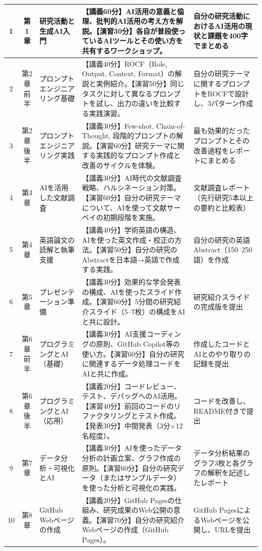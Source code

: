\begin{longtable}{ccp{1.8cm}p{3.3cm}p{1.8cm}}
1 & 第1章 & 研究活動と生成AI入門 & 【講義60分】AI活用の意義と倫理、批判的AI活用の考え方を解説。【演習30分】各自が普段使っているAIツールとその使い方を共有するワークショップ。 & 自分の研究活動におけるAI活用の現状と課題を400字でまとめる \\
\hline
2 & 第2章前半 & プロンプトエンジニアリング基礎 & 【講義40分】ROCF（Role, Output, Context, Format）の解説と実例紹介。【演習50分】同じタスクに対して異なるプロンプトを試し、出力の違いを比較する実践演習。 & 自分の研究テーマに関するプロンプトをROCFで設計し、3パターン作成 \\
\hline
3 & 第2章後半 & プロンプトエンジニアリング実践 & 【講義30分】Few-shot, Chain-of-Thought, 段階的プロンプトの解説。【演習60分】研究テーマに関する実践的なプロンプト作成と改善のサイクルを体験。 & 最も効果的だったプロンプトとその改善過程をレポートにまとめる \\
\hline
4 & 第3章 & AIを活用した文献調査 & 【講義30分】AI時代の文献調査戦略、ハルシネーション対策。【演習60分】自分の研究テーマについて、AIを使って文献サーベイの初期段階を実施。 & 文献調査レポート（先行研究5本以上の要約と比較表） \\
\hline
5 & 第4章 & 英語論文の読解と執筆支援 & 【講義40分】学術英語の構造、AIを使った英文作成・校正の方法。【演習50分】自分の研究のAbstractを日本語→英語で作成する実践。 & 自分の研究の英語Abstract（150--250語）を作成 \\
\hline
6 & 第5章 & プレゼンテーション準備 & 【講義30分】効果的な学会発表の構成、AIを使ったスライド作成。【演習60分】5分間の研究紹介スライド（5--7枚）の構成をAIと共に設計。 & 研究紹介スライドの完成版を提出 \\
\hline
7 & 第6章前半 & プログラミングとAI（基礎） & 【講義30分】AI支援コーディングの原則、GitHub Copilot等の使い方。【演習60分】自分の研究に関連するデータ処理コードをAIと共に作成。 & 作成したコードとAIとのやり取りの記録を提出 \\
\hline
8 & 第6章後半 & プログラミングとAI（応用） & 【講義20分】コードレビュー、テスト、デバッグへのAI活用。【演習40分】前回のコードのリファクタリングとテスト作成。【発表30分】中間発表（3分×12名程度）。 & コードを改善し、README付きで提出 \\
\hline
9 & 第7章 & データ分析・可視化とAI & 【講義30分】AIを使ったデータ分析の計画立案、グラフ作成の原則。【演習60分】自分の研究データ（またはサンプルデータ）を使った分析と可視化の実践。 & データ分析結果のグラフ3枚と各グラフの解釈を記述したレポート \\
\hline
10 & 第8章 & GitHub Webページの作成 & 【講義20分】GitHub Pagesの仕組み、研究成果のWeb公開の意義。【演習70分】自分の研究紹介Webページの作成（GitHub Pages）。 & GitHub PagesによるWebページを公開し、URLを提出 \\

\end{longtable}
